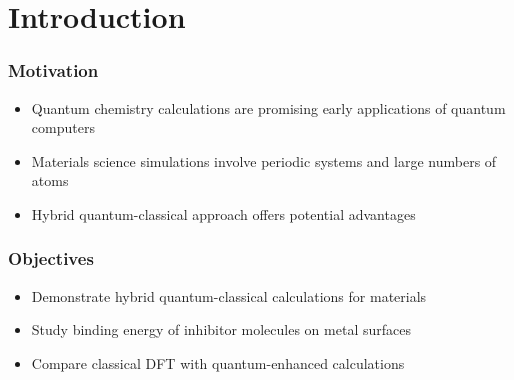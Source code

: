 \section{Introduction}

\begin{frame}
\frametitle{Motivation}
\begin{itemize}
    \item Quantum chemistry calculations are promising early applications of quantum computers
    \item Materials science simulations involve periodic systems and large numbers of atoms
    \item Hybrid quantum-classical approach offers potential advantages
\end{itemize}
\end{frame}

\begin{frame}
\frametitle{Objectives}
\begin{itemize}
    \item Demonstrate hybrid quantum-classical calculations for materials
    \item Study binding energy of inhibitor molecules on metal surfaces
    \item Compare classical DFT with quantum-enhanced calculations
\end{itemize}
\end{frame} 